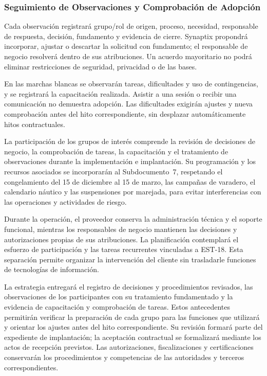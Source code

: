 \subsubsection{Seguimiento de Observaciones y Comprobación de Adopción}

Cada observación registrará grupo/rol de origen, proceso, necesidad, responsable de respuesta, decisión, fundamento y evidencia de cierre. Synaptix propondrá incorporar, ajustar o descartar la solicitud con fundamento; el responsable de negocio resolverá dentro de sus atribuciones. Un acuerdo mayoritario no podrá eliminar restricciones de seguridad, privacidad o de las bases.

En las marchas blancas se observarán tareas, dificultades y uso de contingencias, y se registrará la capacitación realizada. Asistir a una sesión o recibir una comunicación no demuestra adopción. Las dificultades exigirán ajustes y nueva comprobación antes del hito correspondiente, sin desplazar automáticamente hitos contractuales.

La participación de los grupos de interés comprende la revisión de decisiones de negocio, la comprobación de tareas, la capacitación y el tratamiento de observaciones durante la implementación e implantación. Su programación y los recursos asociados se incorporarán al Subdocumento~7, respetando el congelamiento del 15 de diciembre al 15 de marzo, las campañas de varadero, el calendario náutico y las suspensiones por marejada, para evitar interferencias con las operaciones y actividades de riesgo.

Durante la operación, el proveedor conserva la administración técnica y el soporte funcional, mientras los responsables de negocio mantienen las decisiones y autorizaciones propias de sus atribuciones. La planificación contemplará el esfuerzo de participación y las tareas recurrentes vinculadas a EST-18. Esta separación permite organizar la intervención del cliente sin trasladarle funciones de tecnologías de información.

La estrategia entregará el registro de decisiones y procedimientos revisados, las observaciones de los participantes con su tratamiento fundamentado y la evidencia de capacitación y comprobación de tareas. Estos antecedentes permitirán verificar la preparación de cada grupo para las funciones que utilizará y orientar los ajustes antes del hito correspondiente. Su revisión formará parte del expediente de implantación; la aceptación contractual se formalizará mediante los actos de recepción previstos. Las autorizaciones, fiscalizaciones y certificaciones conservarán los procedimientos y competencias de las autoridades y terceros correspondientes.


